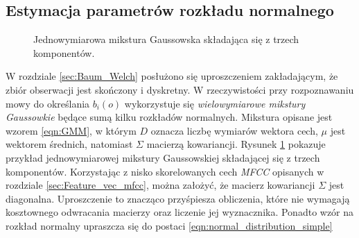 \documentclass[shortabstract, mgr]{iithesis}
\begin{document}
	   \subsection{Estymacja parametrów rozkładu normalnego}
	   	   
	   \begin{figure}[H]
		   \centering
		   \label{fig:gmm}
		   \caption{Jednowymiarowa mikstura Gaussowska składająca się z trzech komponentów.}
	\end{figure}
	   
	   \label{sec:gmm_estimation}
	   W rozdziale \ref{sec:Baum_Welch} posłużono się uproszczeniem zakładającym, że zbiór obserwacji jest skończony i dyskretny. W rzeczywistości przy rozpoznawaniu mowy do określania $b_i(o)$ wykorzystuje się \textit{wielowymiarowe mikstury Gaussowkie} będące sumą kilku rozkładów normalnych. Mikstura opisane jest wzorem \ref{eqn:GMM}, w którym $D$ oznacza liczbę wymiarów wektora cech, $\mu$ jest wektorem średnich, natomiast $\Sigma$ macierzą kowariancji. Rysunek \ref{fig:gmm} pokazuje przykład jednowymiarowej mikstury Gaussowskiej składającej się z trzech komponentów. Korzystając z nisko skorelowanych cech \textit{MFCC} opisanych w rozdziale \ref{sec:Feature_vec_mfcc}, można założyć, że macierz kowariancji $\Sigma$ jest diagonalna. Uproszczenie to znacząco przyśpiesza obliczenia, które nie wymagają kosztownego odwracania macierzy oraz liczenie jej wyznacznika. Ponadto wzór na rozkład normalny upraszcza się do postaci \ref{eqn:normal_distribution_simple}
	   
\end{document}
